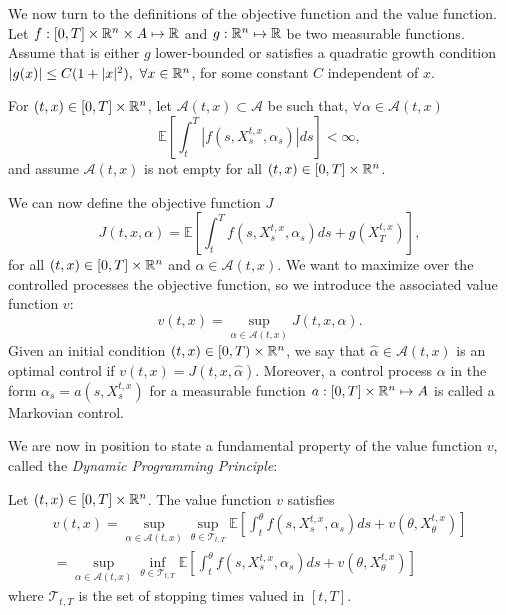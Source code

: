 We now turn to the definitions of the objective function and the value function.
Let $ f: [0,T] \times \mathbb{R}^n \times A \mapsto \mathbb{R} $ and $ g: \mathbb{R}^n \mapsto \mathbb{R} $
be two measurable functions. Assume that is either $g$ lower-bounded or 
satisfies a quadratic growth condition 
$| g(x) | \leq C(1 + |x|^2),\ \forall x \in \mathbb{R}^n$, for some constant $C$
independent of $x$.

For $(t,x) \in [0,T] \times \mathbb{R}^n$, let $\mathcal{A}(t,x) \subset \mathcal{A}$
be such that, $\forall \alpha \in \mathcal{A}(t,x)$
\begin{equation}
    \mathbb{E}\left[ \int_t^T | f(s, X_s^{t,x}, \alpha_s) | ds \right] < \infty,
\end{equation}
and assume $\mathcal{A}(t,x)$ is not empty for all
$(t,x) \in [0,T] \times \mathbb{R}^n$.

We can now define the objective function $J$
\begin{equation}
    J(t, x, \alpha) = \mathbb{E}\left[ \int_t^T f(s, X_s^{t,x}, \alpha_s) ds + g(X^{t,x}_T) \right],
\end{equation}
for all $(t,x) \in [0,T] \times \mathbb{R}^n$ and $\alpha \in \mathcal{A}(t,x)$.
We want to maximize over the controlled processes the objective function, so
we introduce the associated value function $v$:
\begin{equation}
    v(t,x) = \sup_{\alpha \in \mathcal{A}(t,x)} J(t,x,\alpha).
\end{equation}
Given an initial condition $(t,x) \in \left[ 0,T \right) \times \mathbb{R}^n$, we say
that $\hat \alpha \in \mathcal{A}(t,x)$ is an optimal control if
$v(t,x) = J(t,x,\hat \alpha)$.
Moreover, a control process $\alpha$ in the form $\alpha_s = a(s,X_s^{t,x})$ for
a measurable function $a: [0,T] \times \mathbb{R}^n \mapsto A$ is
called a Markovian control.

We are now in position to state a fundamental property of the value function $v$,
called the \textit{Dynamic Programming Principle}:

\begin{theorem}
    Let $(t,x) \in [0,T] \times \mathbb{R}^n$. The value function $v$ satisfies
\begin{gather} 
        v(t,x) = \sup_{\alpha \in \mathcal{A}(t,x)}
        \sup_{\theta \in \mathcal{T}_{t,T}}
        \mathbb{E}\left[ \int_t^\theta f(s, X_s^{t,x}, \alpha_s) ds + v(\theta, X^{t,x}_\theta) \right]\\
        =\sup_{\alpha \in \mathcal{A}(t,x)}
        \inf_{\theta \in \mathcal{T}_{t,T}}
        \mathbb{E}\left[ \int_t^\theta f(s, X_s^{t,x}, \alpha_s) ds + v(\theta, X^{t,x}_\theta) \right]
\end{gather}
    where $\mathcal{T}_{t, T}$ is the set of stopping times valued in $[t,T]$.
\end{theorem}

